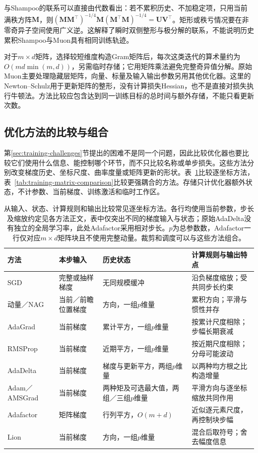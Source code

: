 与Shampoo的联系可以直接由代数看出：若不累积历史、不加稳定项，只用当前满秩方阵$\bm M$，则$(\bm M\bm M^{\top})^{-1/4}\bm M(\bm M^{\top}\bm M)^{-1/4}=\bm U\bm V^{\top}$。矩形或秩亏情况要在非零奇异子空间使用广义逆。这解释了瞬时双侧整形与极分解的联系，不能说明历史累积Shampoo与Muon具有相同训练轨迹。

对于$m\times d$矩阵，选择较短维度构造Gram矩阵后，每次这类迭代的算术量约为$O(md\min(m,d))$，另需临时存储；它用矩阵乘法避免完整奇异值分解。原始Muon主要处理隐藏层矩阵，向量、标量及输入输出参数另用其他优化器。这里的Newton--Schulz用于更新矩阵的整形，没有计算损失Hessian，也不是直接对损失执行牛顿法。方法比较应包含达到同一训练目标的总时间与额外存储，不能只看更新次数。

\subsection{优化方法的比较与组合}
\label{sec:training-optimizer-comparison}

第\ref{sec:training-challenges}节提出的困难不是同一个问题，因此比较优化器也要比较它们使用什么信息、能控制哪个环节，而不只比较名称或单步损失。这些方法分别改变梯度历史、坐标尺度、曲率度量或矩阵更新的形状。表~\ref{tab:training-first-order-comparison}比较逐坐标方法，表~\ref{tab:training-matrix-comparison}比较更强耦合的方法。存储只计优化器额外状态，不计参数、当前梯度、训练激活和临时工作区。
\begin{table}[htbp]
  \centering\small
  \begin{tabularx}{\linewidth}{@{}p{26mm}p{40mm}p{27mm}X@{}}
    \toprule
    方法 & 本步输入 & 历史状态 & 计算规则与输出特点 \\
    \midrule
    SGD & 完整或抽样梯度 & 无同规模缓冲 & 沿负梯度缩放；受共同步长约束 \\
    动量／NAG & 当前／前瞻位置梯度 & 方向，一组$p$维量 & 累积方向；平滑与惯性并存 \\
    AdaGrad & 当前梯度 & 累计平方，一组$p$维量 & 按累计尺度相除；步幅长期衰减 \\
    RMSProp & 当前梯度 & 近期平方，一组$p$维量 & 按近期尺度相除；分母可能波动 \\
    AdaDelta & 当前梯度 & 梯度与更新平方，两组$p$维量 & 以两种均方根之比构造增量 \\
    Adam／AMSGrad & 当前梯度 & 两种矩及可选最大值，两组／三组$p$维量 & 平滑方向与逐坐标缩放共同作用 \\
    Adafactor & 矩阵梯度 & 行列平方，$O(m+d)$ & 近似逐元素尺度，再控制块步幅 \\
    Lion & 当前梯度 & 方向，一组$p$维量 & 混合后取符号；舍去幅度信息 \\
    \bottomrule
  \end{tabularx}
  \caption{从输入、状态、计算规则和输出比较常见逐坐标方法。各行均使用当前参数，步长及缩放约定见各方法正文，表中仅突出不同的梯度输入与状态；原始AdaDelta没有独立的全局学习率，此处Adafactor采用相对步长。$p$为总参数数，Adafactor一行仅对应$m\times d$矩阵块且不使用完整动量。裁剪和调度可以与这些方法组合。}
  \label{tab:training-first-order-comparison}
\end{table}
\FloatBarrier

